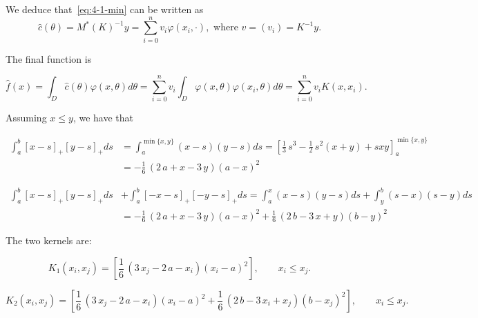 \documentclass{article}
\begin{document}
We deduce that~\eqref{eq:4-1-min} can be written as
\begin{equation}
    \hat{c}(\theta) = M^* (K)^{-1} y = \sum_{i=0}^n v_i \varphi(x_i,\cdot), \mbox{ where } v = (v_i) = K^{-1} y.
\end{equation}

The final function is

\begin{equation}
    \hat f(x) = \int_D \hat c(\theta) \varphi(x,\theta) d\theta = \sum_{i=0}^n v_i \int_D \varphi(x,\theta)\varphi(x_i,\theta) d\theta = \sum_{i=0}^n v_i K(x,x_i).
\end{equation}

Assuming $x\le y$, we have that

\begin{equation}
\begin{aligned}
\int_a^b [x-s]_+[y-s]_+ ds &= \int_a^{\min\{x,y\}} (x-s)(y-s) ds =
\left[\frac{1}{3} \, s^{3} - \frac{1}{2} \, s^{2} {\left(x + y\right)} + s x y\right]_a^{\min\{x,y\}}\\
&=-\frac{1}{6} \, {\left(2 \, a + x - 3 \, y\right)} {\left(a - x\right)}^{2}
\end{aligned}
\end{equation}


\begin{equation}
\begin{aligned}
\int_a^b [x-s]_+[y-s]_+ ds &+ \int_a^b [-x-s]_+[-y-s]_+ ds = \int_a^{x} (x-s)(y-s) ds 
+ \int_y^{b} (s-x)(s-y) ds \\
&=-\frac{1}{6} \, {\left(2 \, a + x - 3 \, y\right)} {\left(a - x\right)}^{2} + \frac{1}{6} \, {\left(2 \, b - 3 \, x + y\right)} {\left(b - y\right)}^{2}
\end{aligned}
\end{equation}

The two kernels are:

\[
K_1(x_i, x_j) = \left[\frac{1}{6} \, {\left(3 \, x_j -2 \, a - x_i\right)} {\left(x_i-a\right)}^{2}\right], \qquad x_i \le x_j.
\]

\[
K_2(x_i, x_j) = \left[\frac{1}{6} \, {\left(3 \, x_j - 2 \, a - x_i \right)} {\left(x_i - a\right)}^{2} + \frac{1}{6} \, {\left(2 \, b - 3 \, x_i + x_j\right)} {\left(b - x_j\right)}^{2} \right], \qquad x_i \le x_j.
\]
\end{document}
